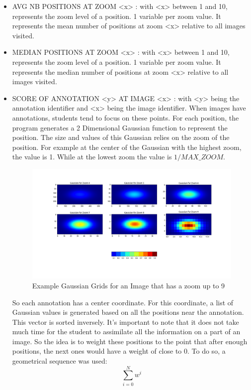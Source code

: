 \documentclass[a4paper,11pt]{report}
\numberwithin{figure}{section} %
\begin{document}
\begin{itemize}
    \item[\textbullet] AVG NB POSITIONS AT ZOOM <x> : with <x> between 1 and 10, represents the zoom level of a position.
    1 variable per zoom value.
    It represents the mean number of positions at zoom <x> relative to all images visited.\\
    \item[\textbullet] MEDIAN POSITIONS AT ZOOM <x> : with <x> between 1 and 10, represents the zoom level of a position.
    1 variable per zoom value.
    It represents the median number of positions at zoom <x> relative to all images visited.\\
    \item[\textbullet] \label{enum:score} SCORE OF ANNOTATION <y> AT IMAGE <x> : with <y> being the annotation identifier and <x> being the image identifier.
    When images have annotations, students tend to focus on these points.
    For each position, the program generates a 2 Dimensional Gaussian function to represent the position.
    The size and values of this Gaussian relies on the zoom of the position.
    For example at the center of the Gaussian with the highest zoom, the value is 1.
    While at the lowest zoom the value is $1/MAX\_ZOOM$.
    \begin{figure}[H]
\begin{center}
\includegraphics[scale=0.35]{gaussian.png}
\caption{Example Gaussian Grids for an Image that has a zoom up to 9}
\end{center}
\end{figure} 
   
   So each annotation has a center coordinate.
   For this coordinate, a list of Gaussian values is generated based on all the positions near the annotation.
   This vector is sorted inversely.
   It's important to note that it does not take much time for the student to assimilate all the information on a part of an image.
   So the idea is to weight these positions to the point that after enough positions, the next ones would have a weight of close to 0.
To do so, a geometrical sequence was used:  
	\[\sum\limits_{i=0}^N w^i\]


\end{itemize}
\end{document}
